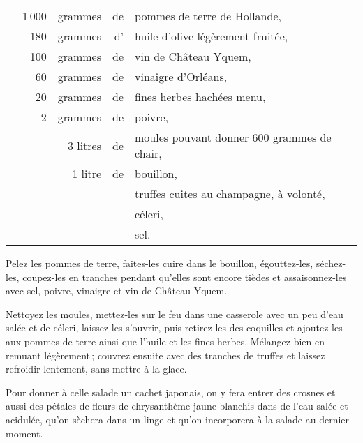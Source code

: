 \footnotesize
\begin{longtable}{rrrrp{16em}}
  &   1 000 & grammes & de & pommes de terre de Hollande,                                                 \\
  &     180 & grammes & d' & huile d'olive légèrement fruitée,                                            \\
  &     100 & grammes & de & vin de Château Yquem,                                                        \\
  &      60 & grammes & de & vinaigre d'Orléans,                                                          \\
  &      20 & grammes & de & fines herbes hachées menu,                                                   \\
  &       2 & grammes & de & poivre,                                                                      \\
  & \multicolumn{2}{r}{3 litres} & de & moules pouvant donner 600 grammes de chair,                       \\
  & \multicolumn{2}{r}{1 litre } & de & bouillon,                                                         \\
  &         &         &    & truffes cuites au champagne, à volonté,                                      \\
  &         &         &    & céleri,                                                                      \\
  &         &         &    & sel.                                                                         \\
\end{longtable}
\normalsize

Pelez les pommes de terre, faites-les cuire dans le bouillon, égouttez-les,
séchez-les, coupez-les en tranches pendant qu'elles sont encore tièdes et
assaisonnez-les avec sel, poivre, vinaigre et vin de Château Yquem.

Nettoyez les moules, mettez-les sur le feu dans une casserole avec un peu d'eau
salée et de céleri, laissez-les s'ouvrir, puis retirez-les des coquilles et
ajoutez-les aux pommes de terre ainsi que l'huile et les fines herbes. Mélangez
bien en remuant légèrement ; couvrez ensuite avec des tranches de truffes et
laissez refroidir lentement, sans mettre à la glace.

\sk

Pour donner à celle salade un cachet japonais, on y fera entrer des crosnes et
aussi des pétales de fleurs de chrysanthème jaune blanchis dans de l’eau salée
et acidulée, qu'on sèchera dans un linge et qu'on incorporera à la salade au
dernier moment.

